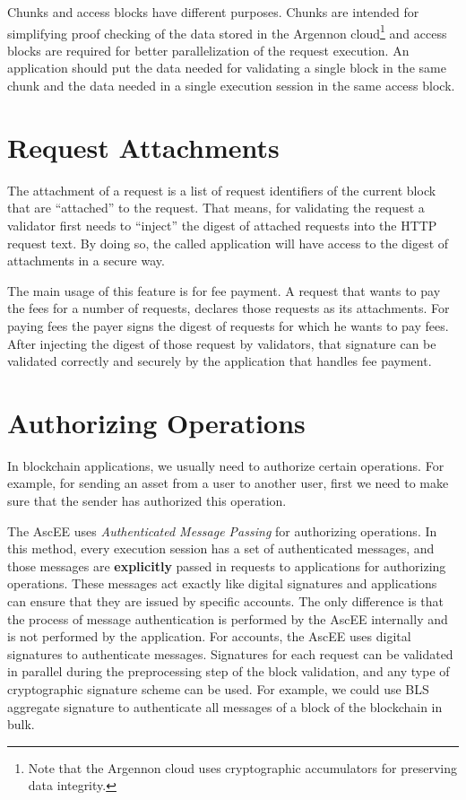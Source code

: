 Chunks and access blocks have different purposes. Chunks are intended for simplifying proof checking of the data
stored in the Argennon cloud\footnote{Note that
the Argennon cloud uses cryptographic accumulators for preserving data integrity.} and access blocks are
required for better parallelization of the request execution. An application should put the data needed for
validating a single block in the same chunk and the data needed in a single execution session in the same access block.


\section{Request Attachments}\label{sec:attachments}

The attachment of a request is a list of request identifiers of the current block that are ``attached'' to the request.
That means, for validating the request a validator first needs to ``inject'' the digest of attached requests into the
HTTP request text. By doing so, the called application will have access to the digest of attachments in a secure way.

The main usage of this feature is for fee payment. A request that wants to pay the fees for a number of requests,
declares those requests as its attachments. For paying fees the payer signs the digest of requests for which he
wants to pay fees. After injecting the digest of those request by validators, that signature can be validated
correctly and securely by the application that handles fee payment.


\section{Authorizing Operations}\label{sec:authorizing-operations}

In blockchain applications, we usually need to authorize certain operations. For example, for sending an asset
from a user to another user, first we need to make sure that the sender has authorized this operation.

The AscEE uses \emph{Authenticated Message Passing} for authorizing operations. In this method, every execution
session has a set of authenticated messages, and those messages are \textbf{explicitly} passed in requests to
applications for authorizing operations. These messages act exactly like digital signatures and applications can
ensure that they are issued by specific accounts. The only difference is that the process of message authentication
is performed by the AscEE internally and is not performed by the application. For accounts, the AscEE uses digital
signatures to authenticate messages. Signatures for each request can be validated in parallel during the
preprocessing step of the block validation, and any type of
cryptographic signature scheme can be used. For example, we could use BLS aggregate signature to authenticate all
messages of a block of the blockchain in bulk.

